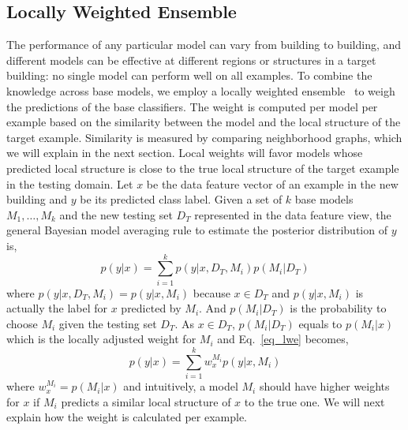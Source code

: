 \subsection{Locally Weighted Ensemble}
The performance of any particular model can vary from building to building, and different models can be effective at different regions or structures in a target building: no single model can perform well on all examples. 
To combine the knowledge across base models,  
we employ a locally weighted ensemble~\cite{lwe} to weigh the predictions of the base classifiers. 
The weight is computed per model per example based on the similarity between the model and the local structure of the target example. 
Similarity is measured by comparing neighborhood graphs, which we will explain in the next section. 
Local weights will favor models whose predicted local structure is close to the true local structure of the target example in the testing domain. 
Let $x$ be the data feature vector of an example in the new building and $y$ be its predicted class label. Given a set of $k$ base models $M_1, \dots, M_k$ and the new testing set $D_T$ represented in the data feature view, the general Bayesian model averaging rule to estimate the posterior distribution of $y$ is,
\begin{equation}\label{eq_lwe}
p(y|x)=\sum_{i=1}^k p(y|x,D_T,M_i) p(M_i|D_T)
\end{equation}
where $p(y|x,D_T,M_i) = p(y|x,M_i)$ because $x \in D_T$ and $p(y|x,M_i)$ is actually the label for $x$ predicted by $M_i$. And $p(M_i|D_T)$ is the probability to choose $M_i$ given the testing set $D_T$. As $x \in D_T$, $p(M_i|D_T)$ equals to $p(M_i|x)$ which is the locally adjusted weight for $M_i$ and Eq.~\ref{eq_lwe} becomes,
\begin{equation}\label{eq_sum}
p(y|x)=\sum_{i=1}^k w_{x}^{M_i} p(y|x, M_i)
\end{equation}
where $w_{x}^{M_i} = p(M_i|x)$ and intuitively, a model $M_i$ should have higher weights for $x$ if $M_i$ predicts a similar local structure of $x$ to the true one.
We will next explain how the weight is calculated per example.

